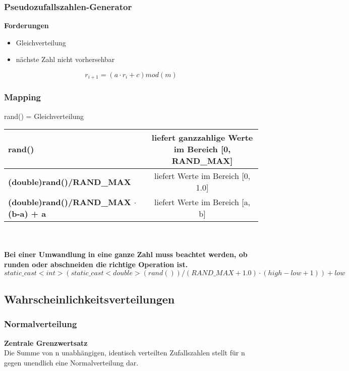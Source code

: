 \subsubsection{Pseudozufallszahlen-Generator}

\textbf{Forderungen}
\begin{itemize}
	\item Gleichverteilung
	\item nächste Zahl nicht vorhersehbar
\end{itemize}
\begin{equation}
	r_{i+1} = (a \cdot r_i + c)mod (m)
\end{equation}

\subsubsection{Mapping}
rand() = Gleichverteilung\\

\begin{tabular}{|l|c|}
	\hline
	\textbf{rand()}                              & liefert ganzzahlige Werte im Bereich [0, RAND\_MAX] \\ \hline
	\textbf{(double)rand()/RAND\_MAX}            &         liefert Werte im Bereich [0, 1.0]          \\ \hline
	\textbf{(double)rand()/RAND\_MAX $\cdot$(b-a) + a} &          liefert Werte im Bereich [a, b]           \\ \hline
\end{tabular} \\\\

\textbf{Bei einer Umwandlung in eine ganze Zahl muss beachtet werden, ob runden oder abschneiden die richtige Operation ist.}\\

$static\_cast<int> (static\_cast<double> (rand()) / (RAND\_MAX + 1.0) \cdot (high - low + 1)) + low$


\subsection{Wahrscheinlichkeitsverteilungen}

\subsubsection{Normalverteilung}
\textbf{Zentrale Grenzwertsatz}\\
Die Summe von n unabhängigen, identisch verteilten Zufallszahlen stellt für n gegen unendlich eine Normalverteilung dar.


